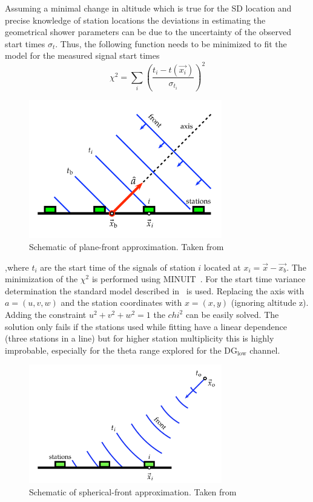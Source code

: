 Assuming a minimal change in altitude which is true for the SD location and precise knowledge of station locations the deviations in estimating the geometrical shower parameters can be due to the uncertainty of the observed start times $\sigma_t$. Thus, the following function needs to be minimized to fit the model for the measured signal start times 
\begin{equation}
  \chi^2 = \sum_{i} \left(\frac{t_i - t(\vec{x_i})}{\sigma_{t_{i}}}\right)^2
\end{equation}

\begin{figure}[t!]
  \centering
  \includegraphics[width=0.75\textwidth]{thesis_figures/Nu_analysis/Plane_fit.pdf}
  \caption{Schematic of plane-front approximation. Taken from~\cite{PierreAuger:2020yab}}
  \label{fig:Plane_fit}
  \end{figure}

,where $t_i$ are the start time of the signals of station $i$ located at $x_i = \vec{x} - \vec{x_b}$. The minimization of the $\chi^2$ is performed using MINUIT~\cite{James:1975dr}. For the start time variance determination the standard model described in~\cite{PierreAuger:2020yab} is used. Replacing the axis with $a =(u,v,w)$ and the station coordinates with $x = (x,y)$ (ignoring altitude z). Adding the constraint $u^2 + v^2 + w^2 = 1$ the $chi^2$ can be easily solved. The solution only fails if the stations used while fitting have a linear dependence (three stations in a line) but for higher station multiplicity this is highly improbable, especially for the theta range explored for the DG$\mathrm{_{low}}$ channel.

\begin{figure}[h!]
  \centering
  \includegraphics[width=0.75\textwidth]{thesis_figures/Nu_analysis/Spherical_fit.png}
  \caption{Schematic of spherical-front approximation. Taken from~\cite{PierreAuger:2020yab}}
  \label{fig:Spherical_fit}
\end{figure}

